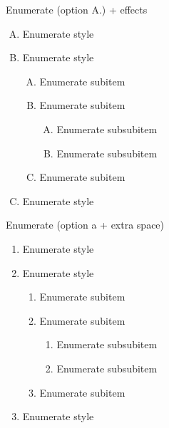 \documentclass[11pt,t]{beamer}
\begin{document}
	\begin{frame}{Enumerate}
		(option A.) + effects
		\begin{enumerate}[A.]
			\item<1-5> Enumerate style
			\item<1-5> Enumerate style
			\begin{enumerate}[A.]
				\item<2-5> Enumerate subitem
				\item<3-5> Enumerate subitem
				\begin{enumerate}[A.]
					\item<3-4> Enumerate subsubitem
					\item<3-4> Enumerate subsubitem
				\end{enumerate}
				\item<4-5> Enumerate subitem
			\end{enumerate}
			\item<5> Enumerate style
		\end{enumerate}
	\end{frame}




	\begin{frame}{Enumerate}
		(option a + extra space)
		\begin{enumerate}[a\enspace]
			\item Enumerate style
			\item Enumerate style
			\begin{enumerate}[a\enspace]
				\item Enumerate subitem
				\item Enumerate subitem
				\begin{enumerate}[a\enspace]
					\item Enumerate subsubitem
					\item Enumerate subsubitem
				\end{enumerate}
				\item Enumerate subitem
			\end{enumerate}
			\item Enumerate style
		\end{enumerate}
	\end{frame}








\end{document}
